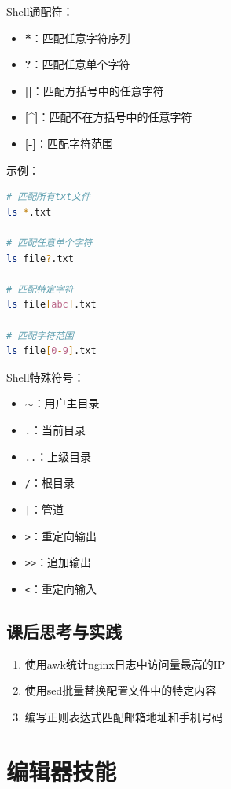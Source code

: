 \documentclass[12pt,UTF8]{ctexbook}
\begin{document}
Shell通配符：

\begin{itemize}
    \item \textbf{*}：匹配任意字符序列
    \item \textbf{?}：匹配任意单个字符
    \item \textbf{[]}：匹配方括号中的任意字符
    \item \textbf{[\^{}]}：匹配不在方括号中的任意字符
    \item \textbf{[-]}：匹配字符范围
\end{itemize}

示例：
\begin{lstlisting}[language=bash]
# 匹配所有txt文件
ls *.txt

# 匹配任意单个字符
ls file?.txt

# 匹配特定字符
ls file[abc].txt

# 匹配字符范围
ls file[0-9].txt
\end{lstlisting}

Shell特殊符号：
\begin{itemize}
    \item \texttt{$\sim$}：用户主目录
    \item \texttt{.}：当前目录
    \item \texttt{..}：上级目录
    \item \texttt{/}：根目录
    \item \texttt{|}：管道
    \item \texttt{>}：重定向输出
    \item \texttt{>>}：追加输出
    \item \texttt{<}：重定向输入
\end{itemize}

\section{课后思考与实践}
\label{sec:text-practice}
\begin{enumerate}
    \item 使用awk统计nginx日志中访问量最高的IP
    \item 使用sed批量替换配置文件中的特定内容
    \item 编写正则表达式匹配邮箱地址和手机号码
\end{enumerate}

\chapter{编辑器技能}
\label{chap:editors}
\end{document}
